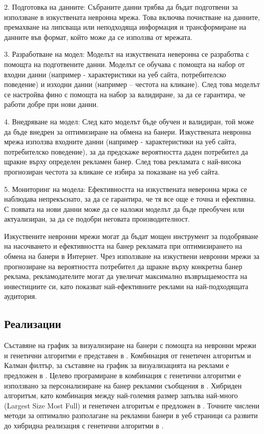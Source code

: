 2. Подготовка на данните: Събраните данни трябва да бъдат подготвени за използване в изкуствената невронна мрежа. Това включва почистване на данните, премахване на липсваща или неподходяща информация и трансформиране на данните във формат, който може да се използва от мрежата.

3. Разработване на модел: Моделът на изкуствената неверонна се разработва с помощта на подготвените данни. Моделът се обучава с помощта на набор от входни данни (например - характеристики на уеб сайта, потребителско поведение) и изходни данни (например – честота на кликане). След това моделът се настройва фино с помощта на набор за валидиране, за да се гарантира, че работи добре при нови данни.

4. Внедряване на модел: След като моделът бъде обучен и валидиран, той може да бъде внедрен за оптимизиране на обмена на банери. Изкуствената невронна мрежа използва входните данни (например - характеристики на уеб сайта, потребителско поведение), за да предскаже вероятността даден потребител да щракне върху определен рекламен банер. След това рекламата с най-висока прогнозиран честота за кликане се избира за показване на уеб сайта.

5. Мониторинг на модела: Ефективността на изкуствената неверонна мржа се наблюдава непрекъснато, за да се гарантира, че тя все още е точна и ефективна. С появата на нови данни може да се наложи моделът да бъде преобучен или актуализиран, за да се подобри неговата производителност.

Изкуствените невронни мрежи могат да бъдат мощен инструмент за подобряване на насочването и ефективността на банер рекламата при оптимизирането на обмена на банери в Интернет. Чрез използване на изкуствени невронни мрежи за прогнозиране на вероятността потребител да щракне върху конкретна банер реклама, рекламодателите могат да увеличат максимално възвръщаемостта на инвестициите си, като показват най-ефективните реклами на най-подходящата аудитория.

\subsection{Реализации}

Съставяне на график за визуализиране на банери с помощта на невронни мрежи и генетични алгоритми е представен в \cite{DEANE20125168}. Комбинация от генетичен алгоритъм и Калман филтър, за съставяне на график за визуализацията на реклами е предложен в \cite{doi:10.1287/mksc.17.3.214}. Целево програмиране в комбинация с генетични алгоритми е използвано за персонализиране на банер рекламни съобщения в \cite{KARUGA200185}. Хибриден алгоритъм, като комбинация между най-големия размер запълва най-много (Largest Size Most Full) и генетичен алгоритъм е предложен в \cite{KUMAR20061067}. Точните числени методи за оптимално разполагане на рекламни банери в уеб страници са развити до хибридна реализация с генетични алгоритми в \cite{kumar2001hybrid}.

